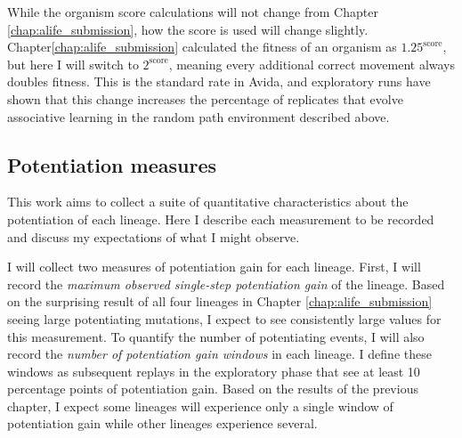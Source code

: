 While the organism score calculations will not change from Chapter \ref{chap:alife_submission}, how the score is used will change slightly. 
Chapter\ref{chap:alife_submission} calculated the fitness of an organism as $1.25^{\text{score}}$, but here I will switch to $2^{\text{score}}$, meaning every additional correct movement always doubles fitness. 
This is the standard rate in Avida, and exploratory runs have shown that this change increases the percentage of replicates that evolve associative learning in the random path environment described above. 

\subsection{Potentiation measures}
\label{sub:potentiation_measures}

This work aims to collect a suite of quantitative characteristics about the potentiation of each lineage. 
Here I describe each measurement to be recorded and discuss my expectations of what I might observe.

I will collect two measures of potentiation gain for each lineage. 
First, I will record the \textit{maximum observed single-step potentiation gain} of the lineage. 
Based on the surprising result of all four lineages in Chapter \ref{chap:alife_submission} seeing large potentiating mutations, I expect to see consistently large values for this measurement. 
To quantify the number of potentiating events, I will also record the \textit{number of potentiation gain windows} in each lineage. 
I define these windows as subsequent replays in the exploratory phase that see at least 10 percentage points of potentiation gain. 
Based on the results of the previous chapter, I expect some lineages will experience only a single window of potentiation gain while other lineages experience several. 

